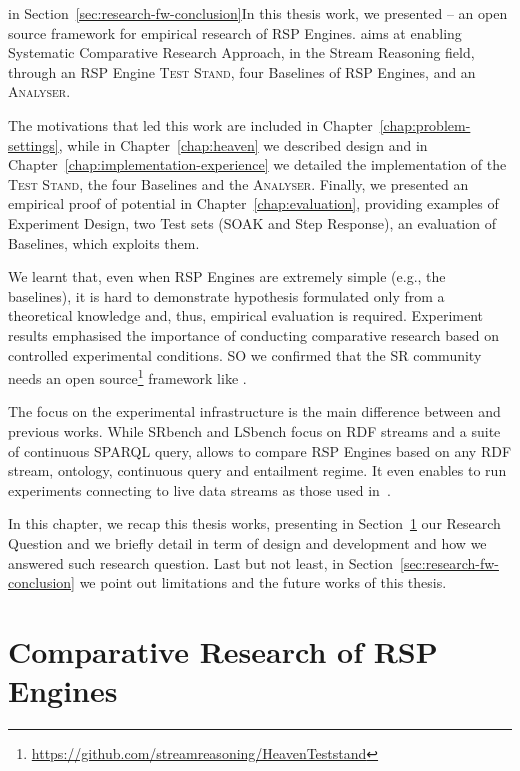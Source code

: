  in Section~\ref{sec:research-fw-conclusion}In this thesis work, we presented \name -- an open source framework for empirical research of RSP Engines. \name aims at enabling Systematic Comparative Research Approach, in the Stream Reasoning field, through an RSP Engine \textsc{Test Stand}, four Baselines of RSP Engines, and an \textsc{Analyser}. 

The motivations that led this work are included in Chapter~\ref{chap:problem-settings}, while in Chapter~\ref{chap:heaven} we described \name design and in Chapter~\ref{chap:implementation-experience} we detailed the implementation of the \textsc{Test Stand}, the four Baselines and the \textsc{Analyser}. Finally, we presented an empirical proof of \name potential in Chapter~\ref{chap:evaluation}, providing examples of Experiment Design, two Test sets (SOAK and Step Response), an evaluation of \name Baselines, which exploits them.

We learnt that, even when RSP Engines are extremely simple (e.g., the baselines), it is hard to demonstrate hypothesis formulated only from a theoretical knowledge and, thus, empirical evaluation is required. Experiment results emphasised the importance of conducting comparative research based on controlled experimental conditions. SO we confirmed that the SR community needs an open source\footnote{\url{https://github.com/streamreasoning/HeavenTeststand}} framework like \namens.

The focus on the experimental infrastructure is the main difference between \name and previous works. While SRbench and LSbench focus on RDF streams and a suite of continuous SPARQL query, \name allows to compare RSP Engines based on any RDF stream, ontology, continuous query and entailment regime. It even enables to run experiments connecting to live data streams as those used in~\cite{DBLP:conf/semweb/BalduiniVDTPC13}.	

In this chapter, we recap this thesis works, presenting in Section~\ref{sec:research-question-conclusion} our Research Question and we briefly detail \name in term of design and development and how we answered such research question. Last but not least, in Section~\ref{sec:research-fw-conclusion} we point out \name limitations and the future works of this thesis.

\section{Comparative Research of RSP Engines}\label{sec:research-question-conclusion}

